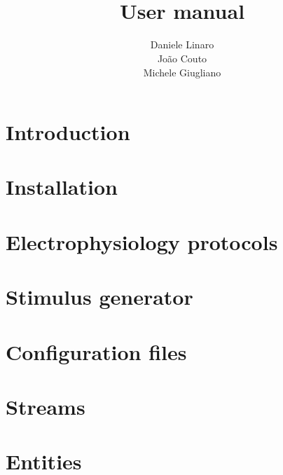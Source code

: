 \documentclass[10pt,a4paper,twoside]{book}
\title{\textbf{\progname} \\ User manual}
\author{Daniele Linaro \\ Jo\~ao Couto \\ Michele Giugliano}
\date{}
\begin{document}
\maketitle
\thispagestyle{empty}

\tableofcontents
\newpage
{}

\chapter{Introduction}
\label{chap:intro}


%

\chapter{Installation}
\label{chap:install}


\chapter{Electrophysiology protocols}
\label{chap:protocols}


\chapter{Stimulus generator}
\label{chap:stimgen}


\chapter{Configuration files}
\label{chap:configuration}


\chapter{Streams}
\label{chap:streams}


\chapter{Entities}
\label{chap:entities}





%
%
%
%
\end{document}
